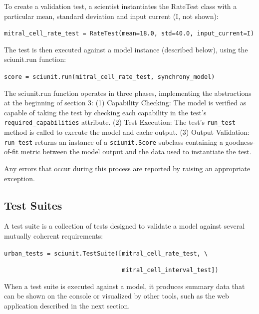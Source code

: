 \documentclass[11pt,letterpaper]{article}
\begin{document}
To create a validation test, a scientist instantiates the RateTest class with a particular mean, standard deviation and input current (I, not shown):

\verb|mitral_cell_rate_test = RateTest(mean=18.0, std=40.0, input_current=I)|

The test is then executed against a model instance (described below), using the sciunit.run function:

\verb|score = sciunit.run(mitral_cell_rate_test, synchrony_model)|

The sciunit.run function operates in three phases, implementing the abstractions at the beginning of section 3:
(1)	Capability Checking: The model is verified as capable of taking the test by checking each capability in the test's \verb|required_capabilities| attribute.
(2)	Test Execution: The test's \verb|run_test| method is called to execute the model and cache output.
(3)	Output Validation: \verb|run_test| returns an instance of a \verb|sciunit.Score| subclass containing a goodness-of-fit metric between the model output and the data used to instantiate the test.

Any errors that occur during this process are reported by raising an appropriate exception.

\subsection{Test Suites}
A test suite is a collection of tests designed to validate a model against several mutually coherent requirements:

\noindent
\verb|urban_tests = sciunit.TestSuite([mitral_cell_rate_test, \|

\noindent
\verb|                                 mitral_cell_interval_test])|

When a test suite is executed against a model, it produces summary data that can be shown on the console or visualized by other tools, such as the web application described in the next section.
\end{document}
